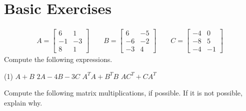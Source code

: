\section{Basic Exercises}

\begin{align*}
  A =
  \begin{bmatrix}
    6 & 1 \\
    -1 & -3 \\
    8 & 1
  \end{bmatrix}
  \qquad
  B =
  \begin{bmatrix}
    6 & -5 \\
    -6 & -2 \\
    -3 & 4
  \end{bmatrix}
  \qquad
  C =
  \begin{bmatrix}
    -4 & 0 \\
    -8 & 5 \\
    -4 & -1
  \end{bmatrix}
\end{align*}
Compute the following expressions.
\begin{tasks}[style=enumerate](1)
\task $A + B$
\task $2A - 4B - 3C$
\task $A^TA + B^TB$
\task $AC^T + CA^T$
\end{tasks}
Compute the following matrix multiplications, if possible.  If it is
not possible, explain why.
